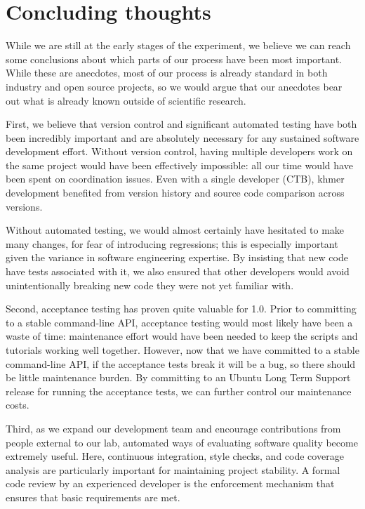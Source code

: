 \documentclass[12pt]{article}
\begin{document}
\section{Concluding thoughts}



While we are still at the early stages of the experiment, we believe
we can reach some conclusions about which parts of our process have
been most important.  While these are anecdotes, most of our process
is already standard in both industry and open source projects, so we
would argue that our anecdotes bear out what is already known outside
of scientific research.

First, we believe that version control and significant automated
testing have both been incredibly important and are absolutely
necessary for any sustained software development effort.  Without
version control, having multiple developers work on the same project
would have been effectively impossible: all our time would have been
spent on coordination issues.  Even with a single developer (CTB),
khmer development benefited from version history and source code
comparison across versions.

Without automated testing, we would almost certainly have hesitated to
make many changes, for fear of introducing regressions; this is
especially important given the variance in software engineering
expertise.  By insisting that new code have tests associated with it,
we also ensured that other developers would avoid unintentionally breaking
new code they were not yet familiar with.

Second, acceptance testing has proven quite valuable for 1.0.  Prior
to committing to a stable command-line API, acceptance testing would
most likely have been a waste of time: maintenance effort would have
been needed to keep the scripts and tutorials working well together.
However, now that we have committed to a stable command-line API, if
the acceptance tests break it will be a bug, so there should be little
maintenance burden.  By committing to an Ubuntu Long Term Support
release for running the acceptance tests, we can further control our
maintenance costs.

Third, as we expand our development team and encourage contributions
from people external to our lab, automated ways of evaluating software
quality become extremely useful.  Here, continuous integration, style
checks, and code coverage analysis are particularly important for
maintaining project stability.  A formal code review by an experienced
developer is the enforcement mechanism that ensures that basic requirements
are met.
\end{document}

